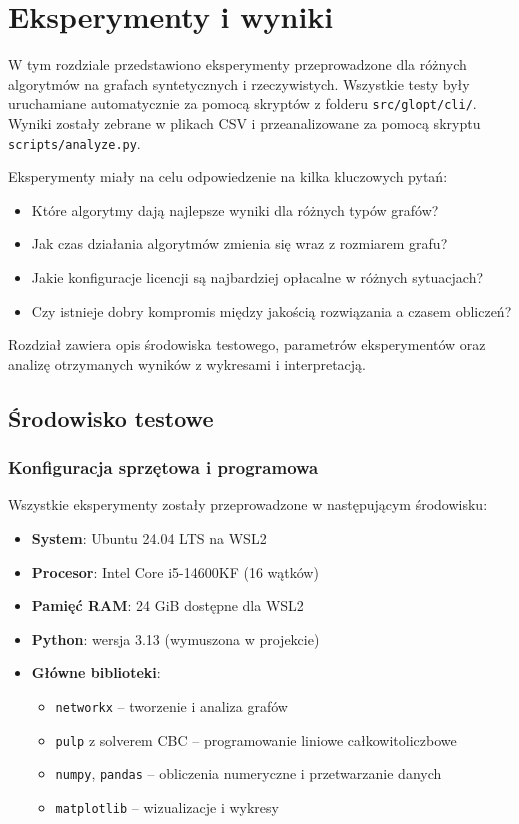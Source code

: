\chapter{Eksperymenty i wyniki}

W tym rozdziale przedstawiono eksperymenty przeprowadzone dla różnych algorytmów na grafach syntetycznych i rzeczywistych. Wszystkie testy były uruchamiane automatycznie za pomocą skryptów z folderu \texttt{src/glopt/cli/}. Wyniki zostały zebrane w plikach CSV i przeanalizowane za pomocą skryptu \texttt{scripts/analyze.py}.

Eksperymenty miały na celu odpowiedzenie na kilka kluczowych pytań:
\begin{itemize}
  \item Które algorytmy dają najlepsze wyniki dla różnych typów grafów?
  \item Jak czas działania algorytmów zmienia się wraz z rozmiarem grafu?
  \item Jakie konfiguracje licencji są najbardziej opłacalne w różnych sytuacjach?
  \item Czy istnieje dobry kompromis między jakością rozwiązania a czasem obliczeń?
\end{itemize}

Rozdział zawiera opis środowiska testowego, parametrów eksperymentów oraz analizę otrzymanych wyników z wykresami i interpretacją.

\section{Środowisko testowe}

\subsection{Konfiguracja sprzętowa i programowa}

Wszystkie eksperymenty zostały przeprowadzone w następującym środowisku:

\begin{itemize}
  \item \textbf{System}: Ubuntu 24.04 LTS na WSL2
  \item \textbf{Procesor}: Intel Core i5-14600KF (16 wątków)
  \item \textbf{Pamięć RAM}: 24 GiB dostępne dla WSL2
  \item \textbf{Python}: wersja 3.13 (wymuszona w projekcie)
  \item \textbf{Główne biblioteki}:
  \begin{itemize}
    \item \texttt{networkx} -- tworzenie i analiza grafów
    \item \texttt{pulp} z solverem CBC -- programowanie liniowe całkowitoliczbowe
    \item \texttt{numpy}, \texttt{pandas} -- obliczenia numeryczne i przetwarzanie danych
    \item \texttt{matplotlib} -- wizualizacje i wykresy
  \end{itemize}
\end{itemize}

